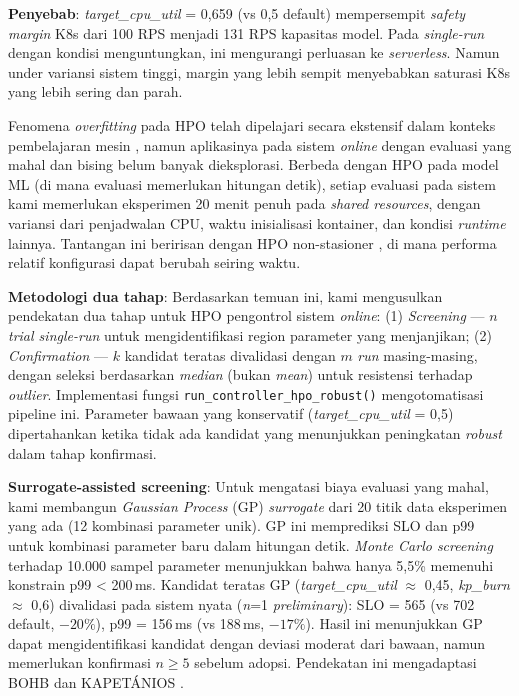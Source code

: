 \textbf{Penyebab}: \emph{target\_cpu\_util} = 0,659 (vs 0,5 default) mempersempit \emph{safety margin} K8s dari 100 RPS menjadi 131 RPS kapasitas model. Pada \emph{single-run} dengan kondisi menguntungkan, ini mengurangi perluasan ke \emph{serverless}. Namun under variansi sistem tinggi, margin yang lebih sempit menyebabkan saturasi K8s yang lebih sering dan parah.

Fenomena \emph{overfitting} pada HPO telah dipelajari secara ekstensif dalam konteks pembelajaran mesin \cite{cawley2010overfitting}, namun aplikasinya pada sistem \emph{online} dengan evaluasi yang mahal dan bising belum banyak dieksplorasi. Berbeda dengan HPO pada model ML (di mana evaluasi memerlukan hitungan detik), setiap evaluasi pada sistem kami memerlukan eksperimen 20 menit penuh pada \emph{shared resources}, dengan variansi dari penjadwalan CPU, waktu inisialisasi kontainer, dan kondisi \emph{runtime} lainnya. Tantangan ini beririsan dengan HPO non-stasioner \cite{nonstationary2022}, di mana performa relatif konfigurasi dapat berubah seiring waktu.

\textbf{Metodologi dua tahap}: Berdasarkan temuan ini, kami mengusulkan pendekatan dua tahap untuk HPO pengontrol sistem \emph{online}: (1) \emph{Screening} — $n$ \emph{trial single-run} untuk mengidentifikasi region parameter yang menjanjikan; (2) \emph{Confirmation} — $k$ kandidat teratas divalidasi dengan $m$ \emph{run} masing-masing, dengan seleksi berdasarkan \emph{median} (bukan \emph{mean}) untuk resistensi terhadap \emph{outlier}. Implementasi fungsi \texttt{run\_controller\_hpo\_robust()} mengotomatisasi pipeline ini. Parameter bawaan yang konservatif (\emph{target\_cpu\_util} = 0,5) dipertahankan ketika tidak ada kandidat yang menunjukkan peningkatan \emph{robust} dalam tahap konfirmasi.

\textbf{Surrogate-assisted screening}: Untuk mengatasi biaya evaluasi yang mahal, kami membangun \emph{Gaussian Process} (GP) \emph{surrogate} dari 20 titik data eksperimen yang ada (12 kombinasi parameter unik). GP ini memprediksi SLO dan p99 untuk kombinasi parameter baru dalam hitungan detik. \emph{Monte Carlo screening} terhadap 10.000 sampel parameter menunjukkan bahwa hanya 5,5\% memenuhi konstrain p99 < 200\,ms. Kandidat teratas GP (\emph{target\_cpu\_util} $\approx$ 0,45, \emph{kp\_burn} $\approx$ 0,6) divalidasi pada sistem nyata (\emph{n}=1 \emph{preliminary}): SLO = 565 (vs 702 default, $-20\%$), p99 = 156\,ms (vs 188\,ms, $-17\%$). Hasil ini menunjukkan GP dapat mengidentifikasi kandidat dengan deviasi moderat dari bawaan, namun memerlukan konfirmasi $n \geq 5$ sebelum adopsi. Pendekatan ini mengadaptasi BOHB \citep{falkner2018bohb} dan KAPETÁNIOS \citep{kapetanios2022}.

